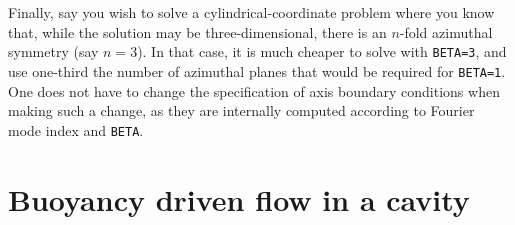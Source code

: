 \documentclass[11pt]{report}
\newcommand\threed{three-di\-men\-sion\-al}
\begin{document}
Finally, say you wish to solve a cylindrical-coordinate problem where
you know that, while the solution may be \threed, there is an $n$-fold
azimuthal symmetry (say $n=3$). In that case, it is much cheaper to
solve with \verb+BETA=3+, and use one-third the number of azimuthal
planes that would be required for \verb+BETA=1+.  One does not have to
change the specification of axis boundary conditions when making such
a change, as they are internally computed according to Fourier mode
index and \verb|BETA|.

\section{Buoyancy driven flow in a cavity}
\label{sec.tdrivcav}
\end{document}
